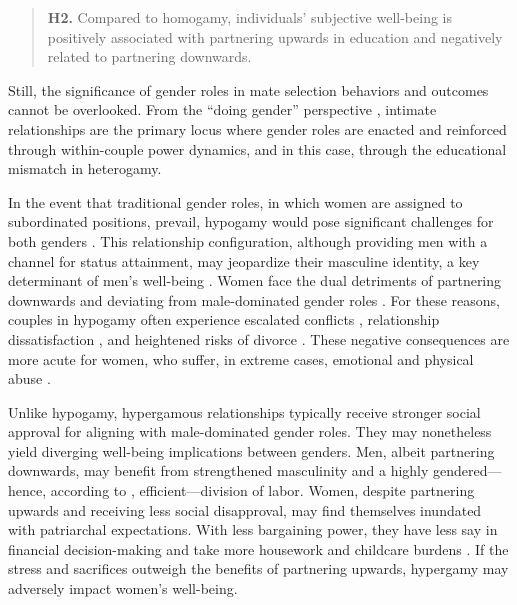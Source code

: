 \begin{quote}
    \textbf{H2.} Compared to homogamy, individuals' subjective well-being is positively associated with partnering upwards in education and negatively related to partnering downwards.
\end{quote}

Still, the significance of gender roles in mate selection behaviors and outcomes cannot be overlooked. From the “doing gender” perspective \parencite{westDoingGender1987}, intimate relationships are the primary locus where gender roles are enacted and reinforced through within-couple power dynamics, and in this case, through the educational mismatch in heterogamy.

In the event that traditional gender roles, in which women are assigned to subordinated positions, prevail, hypogamy would pose significant challenges for both genders \parencite{connellHegemonicMasculinityRethinking2005,kalmijnUnionDisruptionNetherlands2003}. This relationship configuration, although providing men with a channel for status attainment, may jeopardize their masculine identity, a key determinant of men's well-being \parencite{courtenayConstructionsMasculinityTheir2000}. Women face the dual detriments of partnering downwards and deviating from male-dominated gender roles \parencite{potarcaAreWomenHypogamous2022}. For these reasons, couples in hypogamy often experience escalated conflicts \parencite{centersConjugalPowerStructure1971}, relationship dissatisfaction \parencite{beanFamilismMaritalSatisfaction1977}, and heightened risks of divorce \parencite{kalmijnUnionDisruptionNetherlands2003,theunisHisHerEducation2018}. These negative consequences are more acute for women, who suffer, in extreme cases, emotional and physical abuse \parencite{kaukinenStatusCompatibilityPhysical2004}.

Unlike hypogamy, hypergamous relationships typically receive stronger social approval for aligning with male-dominated gender roles. They may nonetheless yield diverging well-being implications between genders. Men, albeit partnering downwards, may benefit from strengthened masculinity and a highly gendered—hence, according to \textcite{beckerTheoryMarriagePart1973,beckerTheoryMarriagePart1974}, efficient—division of labor. Women, despite partnering upwards and receiving less social disapproval, may find themselves inundated with patriarchal expectations. With less bargaining power, they have less say in financial decision-making and take more housework and childcare burdens \parencite{klesmentWomensRelativeResources2022,millerEducationalAssortativeMating2020}. If the stress and sacrifices outweigh the benefits of partnering upwards, hypergamy may adversely impact women's well-being.

